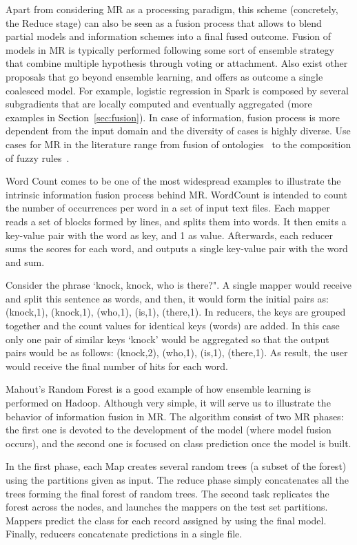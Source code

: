 \documentclass[3p,review]{elsarticle}
\begin{document}
Apart from considering MR as a processing paradigm, this scheme (concretely, the Reduce stage) can also be seen as a fusion process that allows to blend partial models and information schemes into a final fused outcome. Fusion of models in MR is typically performed following some sort of ensemble strategy that combine multiple hypothesis through voting or attachment. Also exist other proposals that go beyond ensemble learning, and offers as outcome a single coalesced model. For example, logistic regression in Spark is composed by several subgradients that are locally computed and eventually aggregated (more examples in Section~\ref{sec:fusion}). In case of information, fusion process is more dependent from the input domain and the diversity of cases is highly diverse. Use cases for MR in the literature range from fusion of ontologies~\cite{zhang14b} to the composition of fuzzy rules~\cite{rio15b}.

Word Count comes to be one of the most widespread examples to illustrate the intrinsic information fusion process behind MR. WordCount is intended to count the number of occurrences per word in a set of input text files. Each mapper reads a set of blocks formed by lines, and splits them into words. It then emits a key-value pair with the word as key, and 1 as value. Afterwards, each reducer sums the scores for each word, and outputs a single key-value pair with the word and sum. 

Consider the phrase `knock, knock, who is there?". A single mapper would receive and split this sentence as words, and then, it would form the initial pairs as: (knock,1), (knock,1), (who,1), (is,1), (there,1). In reducers, the keys are grouped together and the count values for identical keys (words) are added. In this case only one pair of similar keys `knock' would be aggregated so that the output pairs would be as follows: (knock,2), (who,1), (is,1), (there,1). As result, the user would receive the final number of hits for each word. 

Mahout's Random Forest is a good example of how ensemble learning is performed on Hadoop. Although very simple, it will serve us to illustrate the behavior of information fusion in MR. The algorithm consist of two MR phases: the first one is devoted to the development of the model (where model fusion occurs), and the second one is focused on class prediction once the model is built.

In the first phase, each Map creates several random trees (a subset of the forest) using the partitions given as input. The reduce phase simply concatenates all the trees forming the final forest of random trees. The second task replicates the forest across the nodes, and launches the mappers on the test set partitions. Mappers predict the class for each record assigned by using the final model. Finally, reducers concatenate predictions in a single file.
\end{document}
